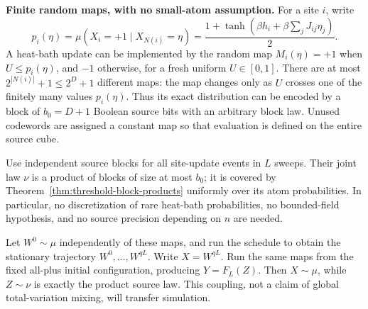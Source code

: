 \textbf{Finite random maps, with no small-atom assumption.}
For a site \(i\), write
\[
 p_i(\eta)=\mu(X_i=+1\mid X_{N(i)}=\eta)
 =\frac{1+\tanh(\beta h_i+\beta\sum_jJ_{ij}\eta_j)}2.
\]
A heat-bath update can be implemented by the random map
\(M_i(\eta)=+1\) when \(U\le p_i(\eta)\), and \(-1\) otherwise,
for a fresh uniform \(U\in[0,1]\). There are at most
\(2^{|N(i)|}+1\le2^D+1\) different maps: the map changes only as
\(U\) crosses one of the finitely many values \(p_i(\eta)\).
Thus its exact distribution can be encoded by a block of
\(b_0=D+1\) Boolean source bits with an arbitrary block law. Unused
codewords are assigned a constant map so that evaluation is defined on
the entire source cube.

Use independent source blocks for all site-update events in \(L\)
sweeps. Their joint law \(\nu\) is a product of blocks of size at most
\(b_0\); it is covered by Theorem~\ref{thm:threshold-block-products}
uniformly over its atom probabilities. In particular, no discretization
of rare heat-bath probabilities, no bounded-field hypothesis, and no
source precision depending on \(n\) are needed.

Let \(W^0\sim\mu\) independently of these maps, and run the schedule
to obtain the stationary trajectory \(W^0,\ldots,W^{qL}\). Write
\(X=W^{qL}\). Run the same maps from the fixed all-plus initial
configuration, producing \(Y=F_L(Z)\). Then \(X\sim\mu\), while
\(Z\sim\nu\) is exactly the product source law. This coupling,
not a claim of global total-variation mixing, will transfer simulation.
